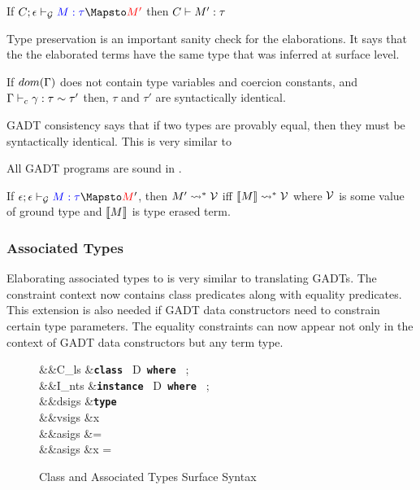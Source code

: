 \documentclass[manuscript,screen,nonacm]{acmart}
\begin{document}
\begin{lemma}
  If $\GTranslate C \empt \Tm \tau {\Tm'}$ then $C \vdash M' : \tau$
\end{lemma}
Type preservation is an important sanity check for the elaborations. It says that the the elaborated terms have the same type that was inferred at surface level.

\begin{theorem}
  If $dom(\Gamma)$ does not contain type variables and coercion constants, and $\Gamma \vdash_{c} \gamma : \tau\sim\tau'$ then, $\tau$ and $\tau'$ are syntactically identical.
\end{theorem}
GADT consistency says that if two types are provably equal, then they must be syntactically identical. This is very similar to 

All GADT programs are sound in \SFC.

\begin{theorem}
  If $\GTranslate \empt \empt \Tm \tau \Tm'$, then $M' \rightsquigarrow^* \mathcal{V}$ iff $\llbracket M\rrbracket \rightsquigarrow^* \mathcal{V}$ where $\mathcal{V}$ is some value of ground type and $\llbracket M\rrbracket$ is type erased term.
\end{theorem}

\subsubsection{Associated Types}
Elaborating associated types to \SFC is very similar to translating GADTs. The constraint context now contains class predicates along with equality predicates. This extension is also needed if GADT data constructors need to constrain certain type parameters. The equality constraints can now appear not only in the context of GADT data constructors but any term type.

\begin{figure}[ht]
  \centering
  \begin{syntax}
     &&C_{ls} &\bnfeq \textbf{\texttt{class }} D\App\many\alpha \textbf{\texttt{ where }} ; \\
     &&I_{nts} &\bnfeq \textbf{\texttt{instance }} D\App\many\tau \textbf{\texttt{ where }} ; \\
     &&dsigs &\bnfeq \textbf{\texttt{type }} \tau\\
     &&vsigs &\bnfeq x\co\tau\\
     &&asigs &\bnfeq \tau = \sigma\\
     &&asigs &\bnfeq x = \Tm
  \end{syntax}
  \caption[Class Syntax]{Class and Associated Types Surface Syntax}
  \label{fig:assoc-types-syntax}
\end{figure}
\end{document}
